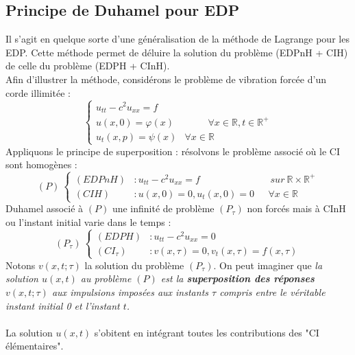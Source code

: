 \documentclass[11pt, a4paper, openany]{book}
\begin{document}
																
																
			\subsection{Principe de Duhamel pour EDP}
			Il s'agit en quelque sorte d'une généralisation de la méthode de Lagrange pour les EDP. Cette méthode permet de déluire la solution du problème (EDPnH + CIH) de celle du problème (EDPH + CInH).\\
			Afin d'illustrer la méthode, considérons le problème de vibration forcée d'un corde illimitée :
			\begin{equation}
				\left\{\begin{array}{lr}
				u_{tt} - c^2u_{xx} = f\\
				u(x,0) = \varphi(x)&\ \ \ \ \ \ \ \ \ \ \ \forall x\in \mathbb{R}, t\in \mathbb{R}^+\\
				u_t(x,p) = \psi(x) & \forall x \in \mathbb{R}
				\end{array}\right.
			\end{equation}
			Appliquons le principe de superposition : résolvons le problème associé où le CI sont homogènes :
			\begin{equation}
				(P)\ \left\{\begin{array}{llr}
				(EDPnH) &: u_{tt} - c^2u_{xx} = f&\ \ \ \ sur\ \mathbb{R}\times\mathbb{R}^+\\
				(CIH) &: u(x,0) = 0, u_t(x,0) = 0 &\ \ \ \forall x \in \mathbb{R}
				\end{array}\right.
			\end{equation}
			Duhamel associé à $(P)$ une infinité de problème $(P_\tau)$ non forcés mais à CInH ou l'instant initial varie dans le temps :
			\begin{equation}
				(P_\tau)\ \left\{\begin{array}{ll}
				(EDPH) &: u_{tt} - c^2u_{xx} = 0\\
				(CI_\tau) &: v(x,\tau) = 0, v_t(x,\tau) = f(x,\tau)
				\end{array}\right.
			\end{equation}
			Notons $v(x,t;\tau)$ la solution du problème $(P_\tau)$. On peut imaginer que \textit{la solution $u(x,t)$ au problème $(P)$ est la \textbf{superposition des réponses $v(x,t;\tau)$} aux impulsions imposées aux instants $\tau$ compris entre le véritable instant initial 0 et l'instant $t$.}\ \\
																
			\ \\
			La solution $u(x,t)$ s'obitent en intégrant toutes les contributions des "CI élémentaires".
																
\end{document}

